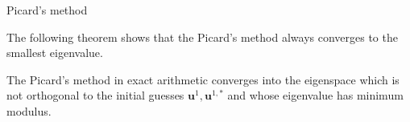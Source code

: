 \documentclass[smallextended]{svjour3}
\begin{document}
\begin{algorithm}[H] \caption{Picard's method} \label{alg:picard} 
\begin{algorithmic}


\REPEAT

\end{algorithmic}
\end{algorithm}
\noindent
The following theorem shows that the Picard's method always converges to the smallest eigenvalue.\\

\begin{theorem}\label{th:picard_conv}
The Picard's method in exact arithmetic converges into the eigenspace which is not orthogonal to the initial guesses $\mathbf{u}^1,\mathbf{u}^{1,*}$ and whose eigenvalue has minimum modulus.
\end{theorem}
\end{document}
